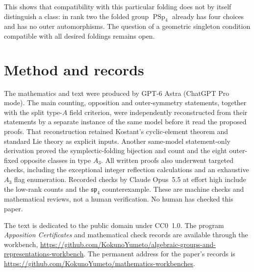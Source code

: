 \documentclass[11pt]{article}
\newcommand{\workbenchurl}{https://github.com/KokunoYumeto/algebraic-groups-and-representations-workbench}
\newcommand{\recordurl}{https://github.com/KokunoYumeto/mathematics-workbenches}
\theoremstyle{definition}\newtheorem{definition}[theorem]{Definition}
\theoremstyle{remark}\newtheorem{remark}[theorem]{Remark}
\begin{document}
This shows that compatibility with this particular folding does not by itself distinguish a class: in rank two the folded group $\operatorname{PSp}_4$ already has four choices and has no outer automorphisms. The question of a geometric singleton condition compatible with all desired foldings remains open.

\section*{Method and records}
The mathematics and text were produced by GPT-6 Astra (ChatGPT Pro mode). The main counting, opposition and outer-symmetry statements, together with the split type-$A$ field criterion, were independently reconstructed from their statements by a separate instance of the same model before it read the proposed proofs. That reconstruction retained Kostant's cyclic-element theorem and standard Lie theory as explicit inputs. Another same-model statement-only derivation proved the symplectic-folding bijection and count and the eight outer-fixed opposite classes in type $A_3$. All written proofs also underwent targeted checks, including the exceptional integer reflection calculations and an exhaustive $A_3$ flag enumeration. Recorded checks by Claude Opus~5.5 at effort high include the low-rank counts and the $\mathfrak{sp}_4$ counterexample. These are machine checks and mathematical reviews, not a human verification. No human has checked this paper.

The text is dedicated to the public domain under CC0~1.0. The program \emph{Apposition Certificates} and mathematical check records are available through the workbench, \url{\workbenchurl}. The permanent address for the paper's records is \url{\recordurl}.
\end{document}
